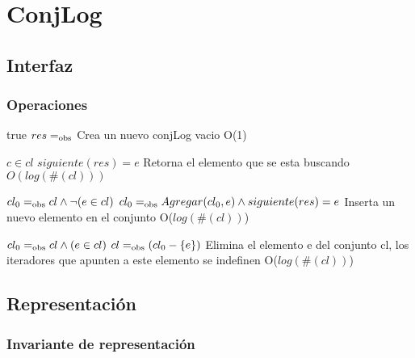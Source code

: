 \section{ConjLog}

\subsection{Interfaz}



\subsubsection*{Operaciones}

{true}
{$res \igobs \empty$}
{Crea un nuevo conjLog vacio}
{O(1)}
{}

{$c \in cl$}
{$siguiente(res) = e$}
{Retorna el elemento que se esta buscando}
{$O(log(\#(cl)))$}
{}

{$cl_0 =_{\mathrm{obs}} cl \land \neg(e \in cl)$}
{$cl_0 =_{\mathrm{obs}} Agregar(cl_0, e) \land siguiente(res)=e$}
{Inserta un nuevo elemento en el conjunto}
{O($log(\#(cl))$)}
{}

{$cl_0 =_{\mathrm{obs}} cl \land (e \in cl)$}
{$cl =_{\mathrm{obs}} (cl_0 - \{e\})$}
{Elimina el elemento e del conjunto cl, los iteradores que apunten a este elemento se indefinen}
{O($log(\#(cl))$)}
{}

\subsection{Representación}


\newpage
\subsubsection*{Invariante de representación}

